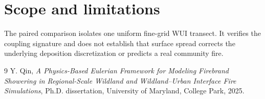 \section{Scope and limitations}
The paired comparison isolates one uniform fine-grid WUI transect. It verifies the coupling signature and does not establish that surface spread corrects the underlying deposition discretization or predicts a real community fire.

\begin{thebibliography}{9}
Y. Qin, \emph{A Physics-Based Eulerian Framework for Modeling Firebrand
Showering in Regional-Scale Wildland and Wildland--Urban Interface Fire
Simulations}, Ph.D. dissertation, University of Maryland, College Park, 2025.
\end{thebibliography}
